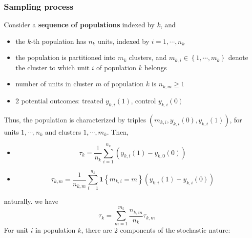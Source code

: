 \documentclass[twoside]{article}
\begin{document}
\subsubsection{Sampling process}
Consider a \textbf{sequence of populations} indexed by $k$, and 
\begin{itemize}
    \item the $k$-th population has $n_k$ units, indexed by $i=1,\cdots,n_k$
    \item the population is partitioned into $m_k$ clusters, and $m_{k,i}\in \left\{1,\cdots,m_k\right\}$ denote the cluster to which unit $i$ of population $k$ belongs 
    \item number of units in cluster $m$ of population $k$ is $n_{k,m}\geq 1$
    \item 2 potential outcomes: treated $y_{k,i}(1)$, control $y_{k,i}(0)$
\end{itemize}
Thus, the population is characterized by triples $\left(m_{k,i},y_{k,i}(0),y_{k,i}(1)\right)$, for units $1,\cdots,n_k$ and clusters $1,\cdots,m_k$. Then, 
\begin{itemize}
    \item {} $$ \tau _k = \frac{1}{n_k}\sum^{n_k}_{i=1} \left(y_{k,i}(1) - y_{k,0}(0)\right) $$
    \item {} $$ \tau_{k,m} = \frac{1}{n_{k,m}} \sum^{n_k}_{i=1}\mathbf{1}\left\{m_{k,i}=m\right\} \left(y_{k,i}(1)-y_{k,i}(0)\right) $$
\end{itemize}
naturally. we have $$ \tau_k = \sum^{m_k}_{m=1}\frac{n_{k,m}}{n_k} \tau_{k,m} $$
For unit $i$ in population $k$, there are 2 components of the stochastic nature: 
\end{document}
